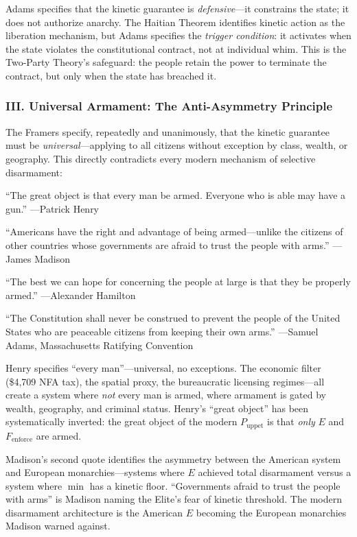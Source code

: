 \documentclass[12pt,openany]{book}
\begin{document}
Adams specifies that the kinetic guarantee is \textit{defensive}---it constrains the state; it does not authorize anarchy. The Haitian Theorem identifies kinetic action as the liberation mechanism, but Adams specifies the \textit{trigger condition}: it activates when the state violates the constitutional contract, not at individual whim. This is the Two-Party Theory's safeguard: the people retain the power to terminate the contract, but only when the state has breached it.

\subsubsection*{III. Universal Armament: The Anti-Asymmetry Principle}

The Framers specify, repeatedly and unanimously, that the kinetic guarantee must be \textit{universal}---applying to all citizens without exception by class, wealth, or geography. This directly contradicts every modern mechanism of selective disarmament:

\begin{historicalsource}
``The great object is that every man be armed. Everyone who is able may have a gun.'' \hfill ---Patrick Henry

\medskip
``Americans have the right and advantage of being armed---unlike the citizens of other countries whose governments are afraid to trust the people with arms.'' \hfill ---James Madison

\medskip
``The best we can hope for concerning the people at large is that they be properly armed.'' \hfill ---Alexander Hamilton

\medskip
``The Constitution shall never be construed to prevent the people of the United States who are peaceable citizens from keeping their own arms.'' \hfill ---Samuel Adams, Massachusetts Ratifying Convention
\end{historicalsource}

Henry specifies ``every man''---universal, no exceptions. The economic filter (\$4,709 NFA tax), the spatial proxy, the bureaucratic licensing regimes---all create a system where \textit{not} every man is armed, where armament is gated by wealth, geography, and criminal status. Henry's ``great object'' has been systematically inverted: the great object of the modern $P_{\text{uppet}}$ is that \textit{only} $E$ and $F_{\text{enforce}}$ are armed.

Madison's second quote identifies the asymmetry between the American system and European monarchies---systems where $E$ achieved total disarmament versus a system where $\min$ has a kinetic floor. ``Governments afraid to trust the people with arms'' is Madison naming the Elite's fear of kinetic threshold. The modern disarmament architecture is the American $E$ becoming the European monarchies Madison warned against.
\end{document}
